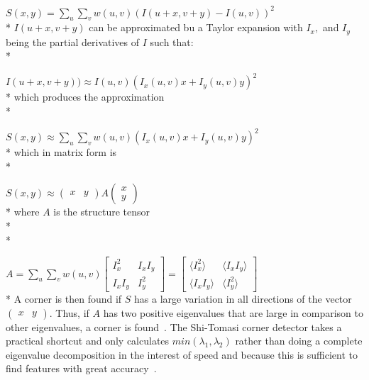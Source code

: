 \documentclass{article} %
\begin{document}
{\centering
$ S(x,y) = \sum\limits_{u}\sum\limits_{v}w(u,v)(I(u+x, v+y) - I(u,v))^2$\linebreak\newline\\*}
$I(u+x,v+y)$ can be approximated bu a Taylor expansion with $I_x,$ and $I_y$ being the partial derivatives of $I$ such that:\\*

{\centering
$I(u+x,v+y)) \approx I(u,v) (I_x(u,v) x+I_y(u,v) y)^2$\linebreak\newline\\*}
which produces the approximation\\*

{\centering
$S(x,y) \approx \sum\limits_{u}\sum\limits_{v}w(u,v) (I_x(u,v) x+I_y(u,v) y)^2$\linebreak\newline\\*}
which in matrix form is\\*

{\centering
$S(x,y) \approx \left(\begin{smallmatrix}
x & y
\end{smallmatrix}\right) A
\left(\begin{smallmatrix}
x\\
y
\end{smallmatrix}\right)$\linebreak\newline\\*}
where $A$ is the structure tensor\\*
\\*

{\centering
$
A = \sum_u \sum_v w(u,v) 
\begin{bmatrix}
I_x^2 & I_x I_y \\
I_x I_y & I_y^2 
\end{bmatrix}
=
\begin{bmatrix}
\langle I_x^2 \rangle & \langle I_x I_y \rangle\\
\langle I_x I_y \rangle & \langle I_y^2 \rangle
\end{bmatrix}$\linebreak\newline\\*}
A corner is then found if $S$ has a large variation in all directions of the vector $\begin{pmatrix} x & y \end{pmatrix}$. Thus, if $A$ has two positive eigenvalues that are large in comparison to other eigenvalues, a corner is found~\cite{tommasini1998making}. The Shi-Tomasi corner detector takes a practical shortcut and only calculates $min(\lambda_1, \lambda_2)$ rather than doing a complete eigenvalue decomposition in the interest of speed and because this is sufficient to find features with great accuracy~\cite{Shi94}.
\end{document}
